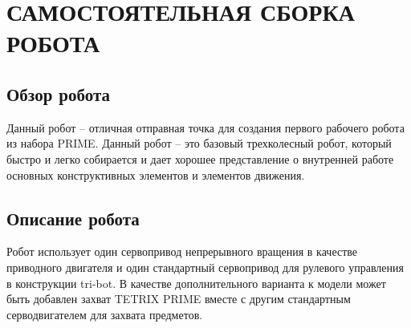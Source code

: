 \chapter{САМОСТОЯТЕЛЬНАЯ СБОРКА РОБОТА}
\section{Обзор робота}
Данный робот -- отличная отправная точка для создания первого рабочего робота из
набора PRIME. Данный робот -- это базовый трехколесный робот, который быстро и легко
собирается и дает хорошее представление о внутренней работе основных конструктивных элементов и
элементов движения.

\section{Описание робота}
Робот использует один сервопривод непрерывного вращения в качестве приводного двигателя и один
стандартный сервопривод для рулевого управления в конструкции tri-bot. В качестве дополнительного варианта
к модели может быть добавлен захват TETRIX PRIME вместе с другим стандартным серводвигателем для захвата предметов.
\newpage

